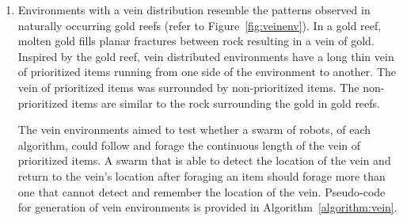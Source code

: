 \begin{enumerate}
\item Environments with a vein distribution resemble the patterns observed in naturally occurring gold reefs \cite{frimmel2002recent} (refer to Figure~\ref{fig:veinenv}). In a gold reef, molten gold fills planar fractures between rock resulting in a vein of gold. Inspired by the gold reef, vein distributed environments have a long thin vein of prioritized items running from one side of the environment to another. The vein of prioritized items was surrounded by non-prioritized items. The non-prioritized items are similar to the rock surrounding the gold in gold reefs.

The vein environments aimed to test whether a swarm of robots, of each algorithm, could follow and forage the continuous length of the vein of prioritized items. A swarm that is able to detect the location of the vein and return to the vein's location after foraging an item should forage more than one that cannot detect and remember the location of the vein.  Pseudo-code for generation of vein environments is provided in Algorithm~\ref{algorithm:vein}.


\end{enumerate} 

